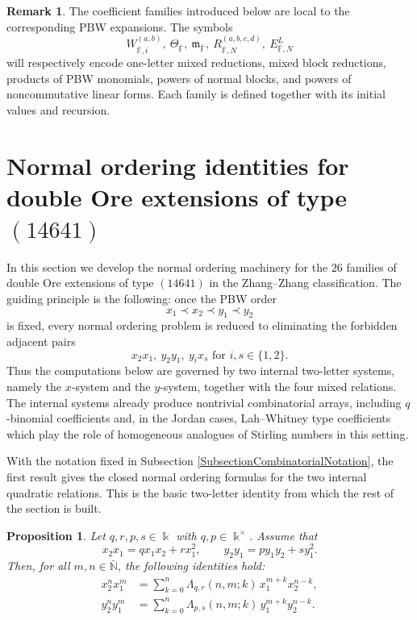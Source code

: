 \documentclass{amsart}
\newtheorem{proposition}[theorem]{Proposition}
\theoremstyle{definition}
\newtheorem{remark}[theorem]{Remark}
\theoremstyle{remark}
\numberwithin{equation}{section}
\begin{document}
\begin{remark}\label{RemarkCoefficientFamilies}
The coefficient families introduced below are local to the corresponding PBW expansions. The symbols
\[
W_{\bar{\mathbb{F}},i}^{(a,b)},\
\Theta_{\bar{\mathbb{F}}},\
\mathfrak{m}_{\bar{\mathbb{F}}},\
R_{\bar{\mathbb{F}},N}^{(a,b,c,d)},\
E_{\bar{\mathbb{F}},N}^{L}
\]
will respectively encode one-letter mixed reductions, mixed block reductions, products of PBW monomials, powers of normal blocks, and powers of noncommutative linear forms. Each family is defined together with its initial values and recursion.
\end{remark}

\section{Normal ordering identities for double Ore extensions of type \texorpdfstring{$(14641)$}{(14641)}}\label{SectionNormalOrderingDOE}

In this section we develop the normal ordering machinery for the $26$ families of double Ore extensions of type $(14641)$ in the Zhang--Zhang classification. The guiding principle is the following: once the PBW order
\[
x_1\prec x_2\prec y_1\prec y_2
\]
is fixed, every normal ordering problem is reduced to eliminating the forbidden adjacent pairs
\[
x_2x_1,\ y_2y_1,\ y_ix_s \text{ for } i,s\in\{1,2\}.
\]
Thus the computations below are governed by two internal two-letter systems, namely the $x$-system and the $y$-system, together with the four mixed relations. The internal systems already produce nontrivial combinatorial arrays, including $q$-binomial coefficients and, in the Jordan cases, Lah--Whitney type coefficients which play the role of homogeneous analogues of Stirling numbers in this setting.

With the notation fixed in Subsection \ref{SubsectionCombinatorialNotation}, the first result gives the closed normal ordering formulas for the two internal quadratic relations. This is the basic two-letter identity from which the rest of the section is built.

\begin{proposition}\label{PropositionInternalNormalOrdering}
Let $q,r,p,s\in\Bbbk$ with $q,p\in\Bbbk^\times$. Assume that
\[
x_2x_1=qx_1x_2+rx_1^2,
\qquad
y_2y_1=py_1y_2+sy_1^2.
\]
Then, for all $m,n\in\bar{\mathbb{N}}$, the following identities hold:
\begin{align}
x_2^nx_1^m
&=
\sum_{k=0}^{n}
\Lambda_{q,r}(n,m;k)\,
x_1^{m+k}x_2^{n-k}, \label{EquationXInternalNormalOrdering}\\
y_2^ny_1^m
&=
\sum_{k=0}^{n}
\Lambda_{p,s}(n,m;k)\,
y_1^{m+k}y_2^{n-k}. \label{EquationYInternalNormalOrdering}
\end{align}
\end{proposition}
\end{document}
